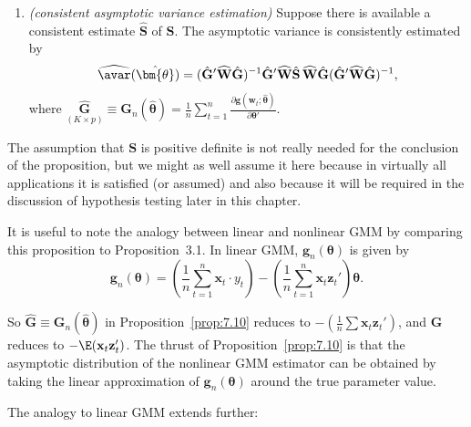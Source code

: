 \begin{proposition}
\begin{enumerate}[label=(\alph*)]
\item \emph{(consistent asymptotic variance estimation)} \enspace Suppose there is available a consistent estimate $\hat{\mathbf{S}}$ of $\mathbf{S}$. The asymptotic variance is consistently estimated by
\begin{equation}
\label{eq:7.3.34}
\widehat{\avar}(\hat{\bm{\theta}}) = (\hat{\mathbf{G}}'\widehat{\mathbf{W}}\hat{\mathbf{G}})^{-1}\hat{\mathbf{G}}'\widehat{\mathbf{W}}\hat{\mathbf{S}}\,\widehat{\mathbf{W}}\hat{\mathbf{G}}(\hat{\mathbf{G}}'\widehat{\mathbf{W}}\hat{\mathbf{G}})^{-1},
\end{equation}
where $\underset{(K \times p)}{\hat{\mathbf{G}}} \equiv \mathbf{G}_n(\hat{\bm{\theta}}) = \frac{1}{n}\sum_{t=1}^{n}\frac{\partial\mathbf{g}(\mathbf{w}_t; \hat{\bm{\theta}})}{\partial\bm{\theta}'}$.
\end{enumerate}
\end{proposition}

The assumption that $\mathbf{S}$ is positive definite is not really needed for the conclusion of the proposition, but we might as well assume it here because in virtually all applications it is satisfied (or assumed) and also because it will be required in the discussion of hypothesis testing later in this chapter.

It is useful to note the analogy between linear and nonlinear GMM by comparing this proposition to Proposition~3.1. In linear GMM, $\mathbf{g}_n(\bm{\theta})$ is given by
\begin{equation}
\label{eq:7.3.35}
\mathbf{g}_n(\bm{\theta}) = \left(\frac{1}{n}\sum_{t=1}^{n}\mathbf{x}_t \cdot y_t\right) - \left(\frac{1}{n}\sum_{t=1}^{n}\mathbf{x}_t \mathbf{z}_t'\right)\bm{\theta}.
\end{equation}

So $\hat{\mathbf{G}} \equiv \mathbf{G}_n(\hat{\bm{\theta}})$ in Proposition~\ref{prop:7.10} reduces to $-(\frac{1}{n}\sum \mathbf{x}_t \mathbf{z}_t')$, and $\mathbf{G}$ reduces to $-\E(\mathbf{x}_t \mathbf{z}_t')$. The thrust of Proposition~\ref{prop:7.10} is that the asymptotic distribution of the nonlinear GMM estimator can be obtained by taking the linear approximation of $\mathbf{g}_n(\bm{\theta})$ around the true parameter value.

The analogy to linear GMM extends further:

